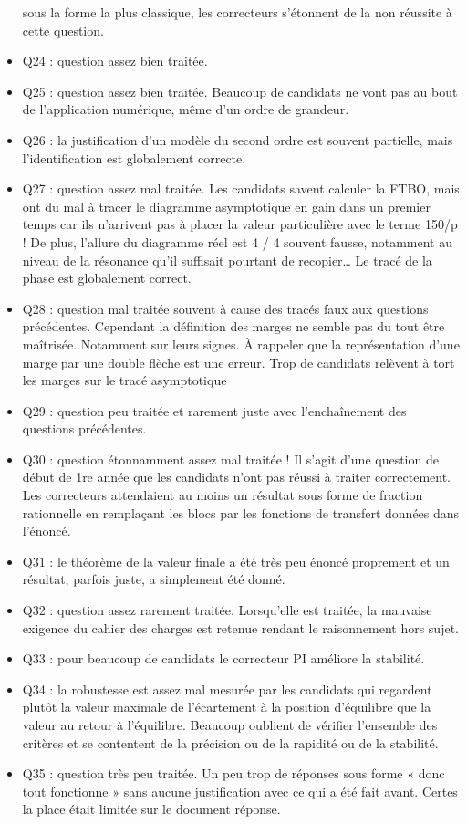 \documentclass[10pt,fleqn]{article} %
\begin{document}
\begin{itemize}
sous la forme la plus classique, les correcteurs s’étonnent de la non réussite à cette
question.
\item Q24 : question assez bien traitée.
\item Q25 : question assez bien traitée. Beaucoup de candidats ne vont pas au bout de
l’application numérique, même d’un ordre de grandeur.
\item Q26 : la justification d’un modèle du second ordre est souvent partielle, mais l’identification
est globalement correcte.
\item Q27 : question assez mal traitée. Les candidats savent calculer la FTBO, mais ont du mal
à tracer le diagramme asymptotique en gain dans un premier temps car ils n’arrivent pas à
placer la valeur particulière avec le terme 150/p ! De plus, l’allure du diagramme réel est
4 / 4
souvent fausse, notamment au niveau de la résonance qu’il suffisait pourtant de recopier…
Le tracé de la phase est globalement correct.
\item Q28 : question mal traitée souvent à cause des tracés faux aux questions précédentes.
Cependant la définition des marges ne semble pas du tout être maîtrisée. Notamment sur
leurs signes. À rappeler que la représentation d’une marge par une double flèche est une
erreur. Trop de candidats relèvent à tort les marges sur le tracé asymptotique
\item Q29 : question peu traitée et rarement juste avec l’enchaînement des questions
précédentes.
\item Q30 : question étonnamment assez mal traitée ! Il s’agit d’une question de début de 1re
année que les candidats n’ont pas réussi à traiter correctement. Les correcteurs attendaient
au moins un résultat sous forme de fraction rationnelle en remplaçant les blocs par les
fonctions de transfert données dans l’énoncé.
\item Q31 : le théorème de la valeur finale a été très peu énoncé proprement et un résultat, parfois
juste, a simplement été donné.
\item Q32 : question assez rarement traitée. Lorsqu’elle est traitée, la mauvaise exigence du
cahier des charges est retenue rendant le raisonnement hors sujet.
\item Q33 : pour beaucoup de candidats le correcteur PI améliore la stabilité.
\item Q34 : la robustesse est assez mal mesurée par les candidats qui regardent plutôt la valeur
maximale de l’écartement à la position d’équilibre que la valeur au retour à l’équilibre.
Beaucoup oublient de vérifier l’ensemble des critères et se contentent de la précision ou de
la rapidité ou de la stabilité.
\item Q35 : question très peu traitée. Un peu trop de réponses sous forme « donc tout
fonctionne » sans aucune justification avec ce qui a été fait avant. Certes la place était
limitée sur le document réponse.
\end{itemize}



%
\end{document}
